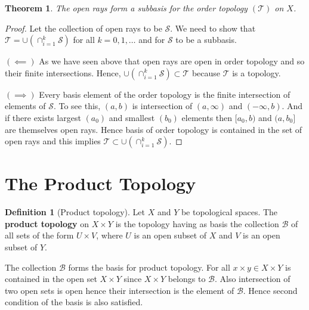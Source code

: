 \documentclass[12pt,reqno]{amsart}
\theoremstyle{plain}
\newtheorem{thm}{Theorem}
\theoremstyle{definition}
\newtheorem{defn}{Definition}
\newcommand{\cal}[1]{\mathcal{#1}}
\begin{document}
\begin{thm}
    The open rays form a subbasis for the order topology $(\cal T)$ on $X$.
\end{thm}
\begin{proof}
    Let the collection of open rays to be $\cal S$. We need to show that $\cal T = \cup (\cap_{i= 1}^{k}\cal S)$ for all $k = 0, 1, \dots$ and for $\cal S$ to be a subbasis.

    \noindent $(\impliedby)$ As we have seen above that open rays are open in order topology and so their finite intersections. Hence, $\cup (\cap_{i= 1}^{k}\cal S) \subset \cal T$ because $\cal T$ is a topology.

    \noindent $(\implies)$ Every basis element of the order topology is the finite intersection of elements of $\cal S$. To see this, $(a,b)$ is intersection of $(a, \infty)$ and $(-\infty, b)$. And if there exists largest $(a_0)$ and smallest $(b_0)$ elements then $[a_0, b)$ and $(a,b_0]$ are themselves open rays. Hence basis of order topology is contained in the set of open rays and this implies $\cal T \subset \cup (\cap_{i= 1}^{k}\cal S)$.
\end{proof}
\section{The Product Topology}
\begin{defn}[Product topology]
    Let $X$ and $Y$ be topological spaces. The {\bf product topology} on $X \times Y$ is the topology having as basis the collection $\cal B$ of all sets of the form $U \times V$, where $U$ is an open subset of $X$ and $V$ is an open subset of $Y$. 
\end{defn}

The collection $\cal B$ forms the basis for product topology. For all $x \times y \in X \times Y$ is contained in the open set $X \times Y$ since $X \times Y$ belongs to $\cal B$. Also intersection of two open sets is open hence their intersection is the element of $\cal B$. Hence second condition of the basis is also satisfied.
\end{document}
